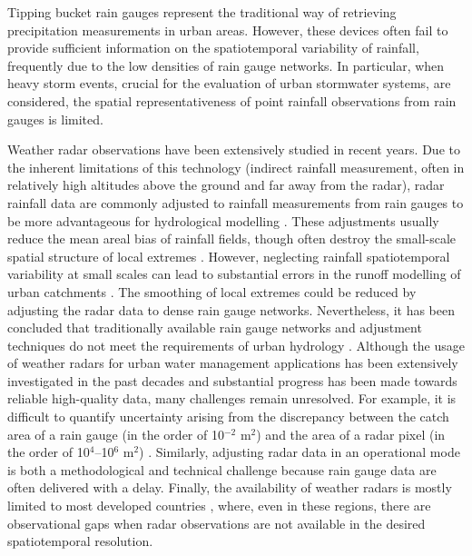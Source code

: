 \documentclass{ctuthesis}\usepackage[]{graphicx}\usepackage[]{color}
\begin{document}
Tipping bucket rain gauges represent the traditional way of retrieving precipitation measurements in urban areas. However, these devices often fail to provide sufficient information on the spatiotemporal variability of rainfall, frequently due to the low densities of rain gauge networks. In particular, when heavy storm events, crucial for the evaluation of urban stormwater systems, are considered, the spatial representativeness of point rainfall observations from rain gauges is limited. 

Weather radar observations have been extensively studied in recent years. Due to the inherent limitations of this technology (indirect rainfall measurement, often in relatively high altitudes above the ground and far away from the radar), radar rainfall data are commonly adjusted to rainfall measurements from rain gauges to be more advantageous for hydrological modelling \citep{harrisonHighresolutionPrecipitationEstimates2009}. These adjustments usually reduce the mean areal bias of rainfall fields, though often destroy the small-scale spatial structure of local extremes \citep{wangSingularitysensitiveGaugebasedRadar2015}. However, neglecting rainfall spatiotemporal variability at small scales can lead to substantial errors in the runoff modelling of urban catchments 
\citep{giresQuantifyingImpactSmall2012}. The smoothing of local extremes could be reduced by adjusting the radar data to dense rain gauge networks. Nevertheless, it has been concluded that traditionally available rain gauge networks and adjustment techniques do not meet the requirements of urban hydrology \citep{wangRadarRaingaugeData2013, borupDynamicGaugeAdjustment2016}. Although the usage of weather radars for urban water management applications has been extensively investigated in the past decades and substantial progress has been made towards reliable high-quality data, many challenges remain unresolved. For example, it is difficult to quantify uncertainty arising from the discrepancy between the catch area of a rain gauge (in the order of 10$^{-2}$ m$^2$) and the area of a radar pixel (in the order of 10$^4$--10$^6$ m$^2$) \citep[e.g.][]{anagnostouUncertaintyQuantificationMeanAreal1999}. Similarly, adjusting radar data in an operational mode is both a methodological and technical challenge because rain gauge data are often delivered with a delay. Finally, the availability of weather radars is mostly limited to most developed countries \citep{heistermannTechnicalNoteOpen2013}, where, even in these regions, there are observational gaps when radar observations are not available in the desired spatiotemporal resolution.
\end{document}
